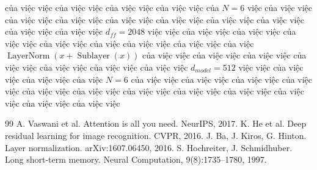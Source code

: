 \documentclass[10pt,twocolumn]{article}
\newcommand{\rxpage}[1]{\write16{RXP:#1:\thepage}}
\begin{document}
của việc việc của việc việc của việc việc của việc việc của $N = 6$ việc của việc việc của việc việc của việc việc của việc việc của việc việc của việc việc của việc việc của việc việc của việc việc $d_{ff} = 2048$ việc việc của việc việc của việc việc của việc việc của việc việc của \cite{ref3} việc của việc việc của việc việc của việc $\operatorname{LayerNorm}(x + \operatorname{Sublayer}(x))$ của việc việc của việc việc của việc việc của việc việc của việc việc của việc việc của việc việc $d_{model} = 512$ việc việc của việc việc của việc việc của việc $N = 6$ của việc việc của việc việc của việc việc của việc việc của việc việc của việc việc của việc việc của việc việc của việc việc của việc việc của việc việc của việc việc\rxpage{b:p1b21}

{\renewcommand{\thefootnote}{}}

{\renewcommand{\thefootnote}{}}

{\renewcommand{\thefootnote}{}}

\begin{thebibliography}{99}
 A. Vaswani et al. Attention is all you need. NeurIPS, 2017.
 K. He et al. Deep residual learning for image recognition. CVPR, 2016.
 J. Ba, J. Kiros, G. Hinton. Layer normalization. arXiv:1607.06450, 2016.
 S. Hochreiter, J. Schmidhuber. Long short-term memory. Neural Computation, 9(8):1735–1780, 1997.
\end{thebibliography}
\end{document}
